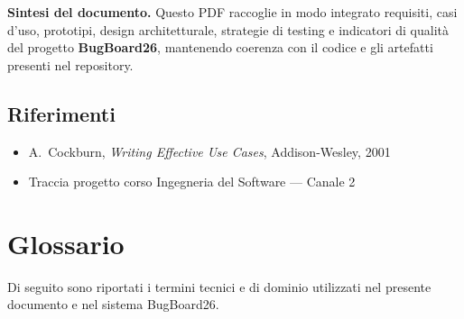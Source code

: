 ﻿\documentclass[a4paper,11pt]{article}
\begin{document}
\begin{highlightbox}
\textbf{Sintesi del documento.} Questo PDF raccoglie in modo integrato requisiti, casi d'uso, prototipi, design architetturale, strategie di testing e indicatori di qualit\`a del progetto \textbf{BugBoard26}, mantenendo coerenza con il codice e gli artefatti presenti nel repository.
\end{highlightbox}

\subsection{Riferimenti}
\begin{itemize}
  \item A.\ Cockburn, \emph{Writing Effective Use Cases}, Addison-Wesley, 2001
  \item Traccia progetto corso Ingegneria del Software --- Canale 2
\end{itemize}

\section{Glossario}
Di seguito sono riportati i termini tecnici e di dominio utilizzati nel presente documento e nel sistema BugBoard26.
\end{document}
